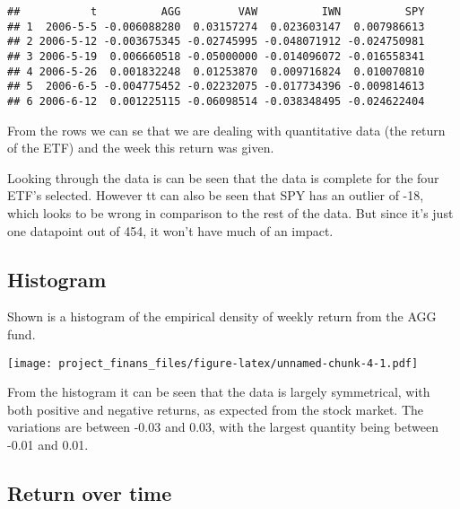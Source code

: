 \documentclass[
]{article}
\newenvironment{Shaded}{\begin{snugshade}}{\end{snugshade}}
\newcommand{\AttributeTok}[1]{\textcolor[rgb]{0.77,0.63,0.00}{#1}}
\newcommand{\ConstantTok}[1]{\textcolor[rgb]{0.00,0.00,0.00}{#1}}
\newcommand{\DecValTok}[1]{\textcolor[rgb]{0.00,0.00,0.81}{#1}}
\newcommand{\FunctionTok}[1]{\textcolor[rgb]{0.00,0.00,0.00}{#1}}
\newcommand{\NormalTok}[1]{#1}
\newcommand{\SpecialCharTok}[1]{\textcolor[rgb]{0.00,0.00,0.00}{#1}}
\newcommand{\StringTok}[1]{\textcolor[rgb]{0.31,0.60,0.02}{#1}}
\begin{document}
\begin{verbatim}
##           t          AGG         VAW          IWN          SPY
## 1  2006-5-5 -0.006088280  0.03157274  0.023603147  0.007986613
## 2 2006-5-12 -0.003675345 -0.02745995 -0.048071912 -0.024750981
## 3 2006-5-19  0.006660518 -0.05000000 -0.014096072 -0.016558341
## 4 2006-5-26  0.001832248  0.01253870  0.009716824  0.010070810
## 5  2006-6-5 -0.004775452 -0.02232075 -0.017734396 -0.009814613
## 6 2006-6-12  0.001225115 -0.06098514 -0.038348495 -0.024622404
\end{verbatim}

From the rows we can se that we are dealing with quantitative data (the
return of the ETF) and the week this return was given.

Looking through the data is can be seen that the data is complete for
the four ETF's selected. However tt can also be seen that SPY has an
outlier of -18, which looks to be wrong in comparison to the rest of the
data. But since it's just one datapoint out of 454, it won't have much
of an impact.

\subsection{Histogram}

Shown is a histogram of the empirical density of weekly return from the
AGG fund.

\begin{Shaded}
\end{Shaded}

\texttt{[image: project\_finans\_files/figure-latex/unnamed-chunk-4-1.pdf]}

From the histogram it can be seen that the data is largely symmetrical,
with both positive and negative returns, as expected from the stock
market. The variations are between -0.03 and 0.03, with the largest
quantity being between -0.01 and 0.01.

\subsection{Return over time}
\end{document}
